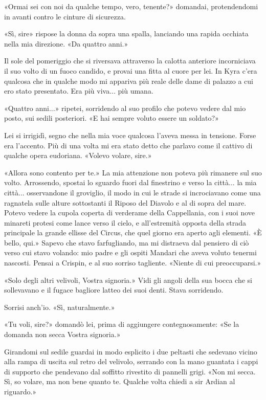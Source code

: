 «Ormai sei con noi da qualche tempo, vero, tenente?» domandai,
protendendomi in avanti contro le cinture di sicurezza.

«Sì, sire» rispose la donna da sopra una spalla, lanciando una rapida
occhiata nella mia direzione. «Da quattro anni.»

Il sole del pomeriggio che si riversava attraverso la calotta anteriore
incorniciava il suo volto di un fuoco candido, e provai una fitta al
cuore per lei. In Kyra c'era qualcosa che in qualche modo mi appariva
più reale delle dame di palazzo a cui ero stato presentato. Era più
viva... più umana.

«Quattro anni...» ripetei, sorridendo al suo profilo che potevo vedere
dal mio posto, sui sedili posteriori. «E hai sempre voluto essere un
soldato?»

Lei si irrigidì, segno che nella mia voce qualcosa l'aveva messa in
tensione. Forse era l'accento. Più di una volta mi era stato detto che
parlavo come il cattivo di qualche opera eudoriana. «Volevo volare,
sire.»

«Allora sono contento per te.» La mia attenzione non poteva più rimanere
sul suo volto. Arrossendo, spostai lo sguardo fuori dal finestrino e
verso la città... la mia città... osservandone il groviglio, il modo in
cui le strade si incrociavano come una ragnatela sulle alture
sottostanti il Riposo del Diavolo e al di sopra del mare. Potevo vedere
la cupola coperta di verderame della Cappellania, con i suoi nove
minareti protesi come lance verso il cielo, e all'estremità opposta
della strada principale la grande ellisse del Circus, che quel giorno
era aperto agli elementi. «È bello, qui.» Sapevo che stavo farfugliando,
ma mi distraeva dal pensiero di ciò verso cui stavo volando: mio padre e
gli ospiti Mandari che aveva voluto tenermi nascosti. Pensai a Crispin,
e al suo sorriso tagliente. «Niente di cui preoccuparsi.»

«Solo degli altri velivoli, Vostra signoria.» Vidi gli angoli della sua
bocca che si sollevavano e il fugace bagliore latteo dei suoi denti.
Stava sorridendo.

Sorrisi anch'io. «Sì, naturalmente.»

«Tu voli, sire?» domandò lei, prima di aggiungere contegnosamente: «Se
la domanda non secca Vostra signoria.»

Girandomi sul sedile guardai in modo esplicito i due peltasti che
sedevano vicino alla rampa di uscita sul retro del velivolo, serrando
con la mano guantata i cappi di supporto che pendevano dal soffitto
rivestito di pannelli grigi. «Non mi secca. Sì, so volare, ma non bene
quanto te. Qualche volta chiedi a sir Ardian al riguardo.»

